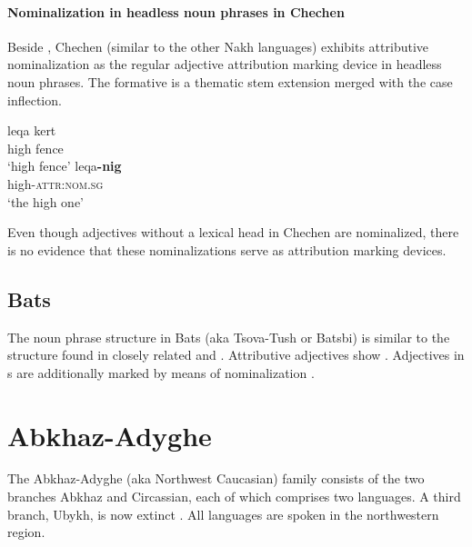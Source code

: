 \paragraph*{Nominalization in headless noun phrases in Chechen}
Beside , Chechen (similar to the other Nakh languages) exhibits attributive nominalization as the regular adjective attribution marking device in headless noun phrases. The formative is a thematic stem extension merged with the case inflection.
\begin{exe}
\begin{xlist}
\ex
\gll	leqa kert\\
	high fence\\
\glt	‘high fence’
\ex	
\gll	leqa\textbf{-nig}\\
	high-\textsc{attr:nom.sg}\\
\glt	‘the high one’
\end{xlist}
\end{exe}
Even though adjectives without a lexical head in Chechen are nominalized, there is no evidence that these nominalizations serve as attribution marking devices.

\subsection{Bats}
The noun phrase structure in Bats (aka Tsova-Tush or Batsbi) is similar to the structure found in closely related  and . Attributive adjectives show . Adjectives in s are additionally marked by means of nominalization \citep[172–172]{holisky-etal1994}.

\section{Abkhaz-Adyghe}
The Abkhaz-Adyghe (aka Northwest Caucasian) family consists of the two branches Abkhaz and Circassian, each of which comprises two languages. A third branch, Ubykh, is now extinct \citep[220, 233]{salminen2007}. All languages are spoken in the northwestern  region.

